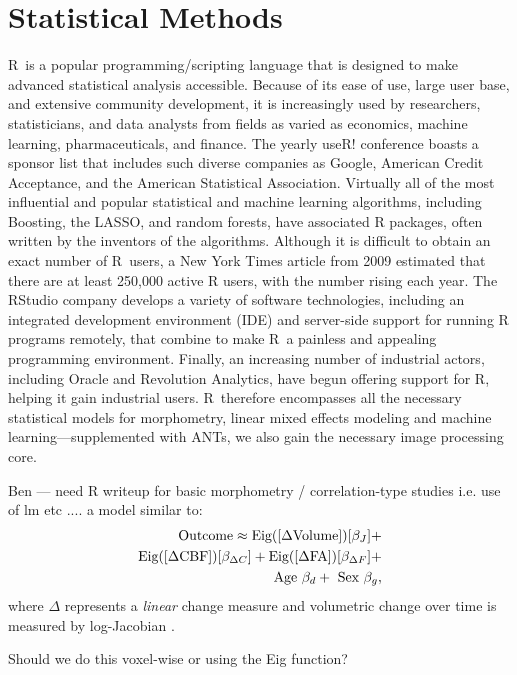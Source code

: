 
\section{Statistical Methods}


R~is a popular
programming/scripting language that is designed to make advanced
statistical analysis accessible.  Because of its ease of use, large user base, and
extensive community development, it is increasingly used by
researchers, statisticians, and data analysts from fields as varied as
economics, machine learning, pharmaceuticals, and finance.  The yearly
useR! conference boasts a sponsor list that includes such diverse
companies as Google, American Credit Acceptance, and the American
Statistical Association.  Virtually all of the most
influential and popular statistical and machine learning algorithms,
including Boosting, the LASSO, and random forests, have associated R
packages, often written by the inventors of the algorithms.  Although
it is difficult to obtain an exact number of R~users, a New York Times
article from 2009 estimated that there are at least 250,000 active R
users, with the number rising each year.  The RStudio company
develops a variety of software technologies, including an integrated
development environment (IDE) and server-side support for running R
programs remotely, that combine to make R~a painless and appealing
programming environment.  Finally, an increasing number of industrial actors, including
Oracle and Revolution Analytics, have begun offering support for R,
helping it gain industrial users.  R~therefore encompasses all the
necessary statistical models for morphometry, linear mixed effects
modeling and machine learning---supplemented with ANTs, we also gain
the necessary image processing core.


Ben --- need R writeup for basic morphometry / correlation-type studies i.e. use of
lm etc .... a model similar to: 
\begin{align}
\label{eq:eig2}
  \text{Outcome} \approx \text{Eig}([ \Delta \text{Volume} ]) [
  \beta_J ] + \\ \notag \text{Eig}([ \Delta \text{CBF} ]) [
  \beta_{\Delta  C} ] + \text{Eig}([ \Delta \text{FA} ]) [
  \beta_{\Delta  F} ] \notag + \\ \notag
~\text{Age}~\beta_d + ~\text{Sex}~\beta_g,
\end{align}
where $\Delta$ represents a {\em linear} change measure and volumetric
change over time is measured by log-Jacobian \cite{Rohlfing2006}.  

Should we do this voxel-wise or using the Eig function?

